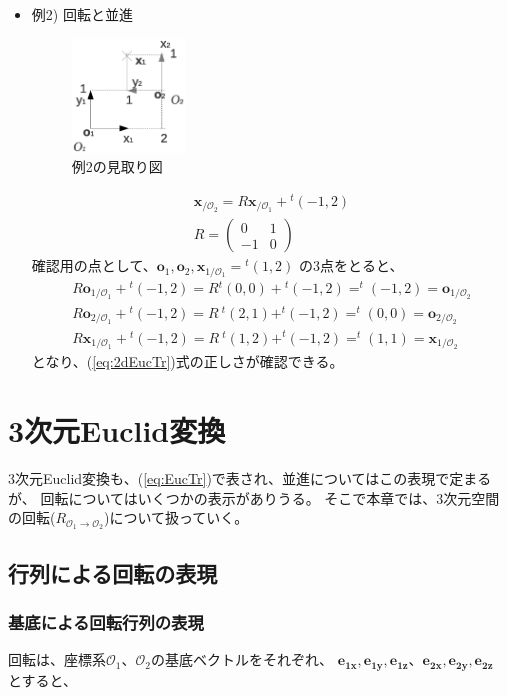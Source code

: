 \documentclass[10pt]{jarticle}
\begin{document}
\begin{itemize}
\item 例2) 回転と並進
  \begin{figure}[htb]
    \centering
    \includegraphics[width=3cm]{ex2.eps}
    \caption{例2の見取り図}
    \label{fig:ex2}
  \end{figure}
\begin{eqnarray}
\boldsymbol{x}_{/\mathcal{O}_2} = R \boldsymbol x_{/\mathcal O_1} + {}^t(-1,2)\\
R=\left(
\begin{array}{ccc}
0 &1  \\
-1& 0
\end{array}
\right)
\end{eqnarray}
確認用の点として、$\boldsymbol{o}_1, \boldsymbol{o}_2, \boldsymbol{x}_{1/\mathcal O_1}={}^t(1,2)$
の3点をとると、
\begin{eqnarray}
R \boldsymbol{o}_{1/\mathcal O_1} + {}^t(-1,2) = R{} ^t(0,0) + {}^t(-1,2) = ^t(-1,2) = \boldsymbol{o}_{1/\mathcal{O}_2} \nonumber\\
R \boldsymbol{o}_{2/\mathcal O_1} + {}^t(-1,2) = R\ ^t(2,1) + ^t(-1,2) =^t(0,0) = \boldsymbol{o}_{2/\mathcal{O}_2} \nonumber\\
R \boldsymbol{x}_{1/\mathcal O_1} + {}^t(-1,2) = R\ ^t(1,2) + ^t(-1,2) =^t(1,1) = \boldsymbol{x}_{1/\mathcal{O}_2} \nonumber
\end{eqnarray}
となり、(\ref{eq:2dEucTr})式の正しさが確認できる。
\end{itemize}



\section{3次元Euclid変換}
3次元Euclid変換も、(\ref{eq:EucTr})で表され、並進についてはこの表現で定まるが、
回転についてはいくつかの表示がありうる。
そこで本章では、3次元空間の回転($R_{\mathcal O_1\rightarrow \mathcal O_2}$)について扱っていく。
\subsection{行列による回転の表現}
\subsubsection{基底による回転行列の表現}
回転は、座標系$\mathcal{O}_1、\mathcal{O}_2$の基底ベクトルをそれぞれ、
$\boldsymbol {e_{1x},e_{1y},e_{1z}}、\boldsymbol {e_{2x},e_{2y},e_{2z}}$
とすると、
\end{document}
